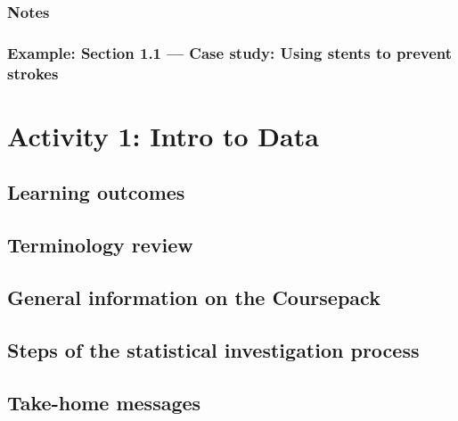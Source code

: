 \documentclass[
]{report}
\begin{document}
\hypertarget{notes}{%
\subsubsection*{Notes}\label{notes}}

\hypertarget{example-section-1.1-case-study-using-stents-to-prevent-strokes}{%
\subsubsection*{Example: Section 1.1 --- Case study: Using stents to prevent strokes}\label{example-section-1.1-case-study-using-stents-to-prevent-strokes}}

\hypertarget{activity-1-intro-to-data}{%
\section{Activity 1: Intro to Data}\label{activity-1-intro-to-data}}

\hypertarget{learning-outcomes}{%
\subsection{Learning outcomes}\label{learning-outcomes}}

\hypertarget{terminology-review}{%
\subsection{Terminology review}\label{terminology-review}}

\hypertarget{general-information-on-the-coursepack}{%
\subsection{General information on the Coursepack}\label{general-information-on-the-coursepack}}

\hypertarget{steps-of-the-statistical-investigation-process}{%
\subsection{Steps of the statistical investigation process}\label{steps-of-the-statistical-investigation-process}}

\hypertarget{take-home-messages}{%
\subsection{Take-home messages}\label{take-home-messages}}
\end{document}
